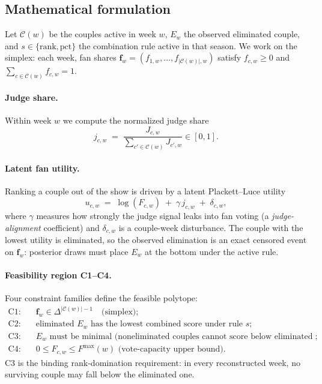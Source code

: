 \documentclass[11pt]{article}
\begin{document}
\subsection{Mathematical formulation}

Let $\mathcal{C}(w)$ be the couples active in week $w$, $E_w$ the observed eliminated
couple, and $s \in \{\text{rank}, \text{pct}\}$ the combination rule active in that season.
We work on the simplex: each week, fan shares $\mathbf{f}_w = (f_{1,w},\dots,f_{|\mathcal
{C}(w)|,w})$ satisfy $f_{c,w} \ge 0$ and $\sum_{c \in \mathcal{C}(w)} f_{c,w} = 1$.

\paragraph{Judge share.} Within week $w$ we compute the normalized judge share
\begin{equation}
j_{c,w} \;=\; \frac{J_{c,w}}{\sum_{c' \in \mathcal{C}(w)} J_{c',w}} \in [0,1].
\end{equation}

\paragraph{Latent fan utility.} Ranking a couple out of the show is driven by a latent
Plackett--Luce utility
\begin{equation}
u_{c,w} \;=\; \log(F_{c,w}) \;+\; \gamma\, j_{c,w} \;+\; \delta_{c,w},
\end{equation}
where $\gamma$ measures how strongly the judge signal leaks into fan voting (a
\emph{judge-alignment} coefficient) and $\delta_{c,w}$ is a couple-week disturbance. The
couple with the lowest utility is eliminated, so the observed elimination is an exact
censored event on $\mathbf{f}_w$: posterior draws must place $E_w$ at the bottom under the
active rule.

\paragraph{Feasibility region C1--C4.} Four constraint families define the feasible
polytope:
\begin{align}
\text{C1:} \quad & \mathbf{f}_w \in \Delta^{|\mathcal{C}(w)|-1} \quad \text{(simplex)}; \\
\text{C2:} \quad & \text{eliminated } E_w \text{ has the lowest combined score under rule } s;
 \\
\text{C3:} \quad & E_w \text{ must be minimal (noneliminated couples cannot score below
eliminated couples)}; \\
\text{C4:} \quad & 0 \le F_{c,w} \le F^{\max}(w) \text{ (vote-capacity upper bound)}.
\end{align}
C3 is the binding rank-domination requirement: in every reconstructed week, no surviving
couple may fall below the eliminated one.
\end{document}
